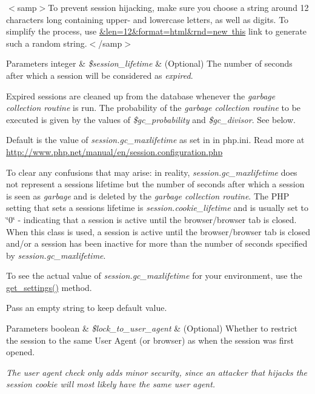 $<$samp$>$To prevent session hijacking, make sure you choose a string around 12 characters long containing upper-\/ and lowercase letters, as well as digits. To simplify the process, use \mbox{\hyperlink{}{\&len=12\&format=html\&rnd=new this}} link to generate such a random string.$<$/samp$>$


\begin{DoxyParams}[1]{Parameters}
integer & {\em \$session\+\_\+lifetime} & (Optional) The number of seconds after which a session will be considered as {\itshape expired}.\\
\hline
\end{DoxyParams}
Expired sessions are cleaned up from the database whenever the {\itshape garbage collection routine} is run. The probability of the {\itshape garbage collection routine} to be executed is given by the values of {\itshape \$gc\+\_\+probability} and {\itshape \$gc\+\_\+divisor}. See below.

Default is the value of {\itshape session.\+gc\+\_\+maxlifetime} as set in in php.\+ini. Read more at \mbox{\hyperlink{}{http\+://www.\+php.\+net/manual/en/session.\+configuration.\+php}}

To clear any confusions that may arise\+: in reality, {\itshape session.\+gc\+\_\+maxlifetime} does not represent a session\textquotesingle{}s lifetime but the number of seconds after which a session is seen as {\itshape garbage} and is deleted by the {\itshape garbage collection routine}. The P\+HP setting that sets a session\textquotesingle{}s lifetime is {\itshape session.\+cookie\+\_\+lifetime} and is usually set to \char`\"{}0\char`\"{} -\/ indicating that a session is active until the browser/browser tab is closed. When this class is used, a session is active until the browser/browser tab is closed and/or a session has been inactive for more than the number of seconds specified by {\itshape session.\+gc\+\_\+maxlifetime}.

To see the actual value of {\itshape session.\+gc\+\_\+maxlifetime} for your environment, use the \mbox{\hyperlink{class_zebra___session_abcfd9631c087a2aa25d472ad9b450c4f}{get\+\_\+settings()}} method.

Pass an empty string to keep default value.


\begin{DoxyParams}[1]{Parameters}
boolean & {\em \$lock\+\_\+to\+\_\+user\+\_\+agent} & (Optional) Whether to restrict the session to the same User Agent (or browser) as when the session was first opened.\\
\hline
\end{DoxyParams}
{\itshape The user agent check only adds minor security, since an attacker that hijacks the session cookie will most likely have the same user agent.}

